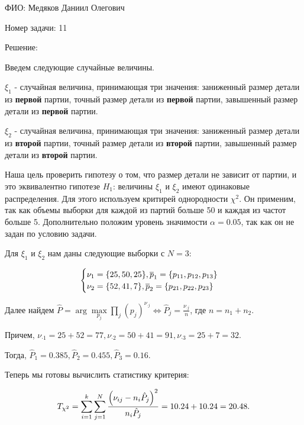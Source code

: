 \documentclass[14pt]{extarticle}
\begin{document}
ФИО: Медяков Даниил Олегович

\vspace{10pt}

Номер задачи: 11

\vspace{10pt}

Решение:

\vspace{10pt}

Введем следующие случайные величины.

$\xi_1$ - случайная величина, принимающая три значения: заниженный размер детали из \textbf{первой} партии, точный размер детали из \textbf{первой} партии, завышенный размер детали из \textbf{первой} партии.

$\xi_2$ - случайная величина, принимающая три значения: заниженный размер детали из \textbf{второй} партии, точный размер детали из \textbf{второй} партии, завышенный размер детали из \textbf{второй} партии.

Наша цель проверить гипотезу о том, что размер детали не зависит от партии, и это эквивалентно гипотезе $H_1$: величины $\xi_1$ и $\xi_2$ имеют одинаковые распределения. Для этого используем критирей однородности $\chi^2$. Он применим, так как объемы выборки для каждой из партий больше 50 и каждая из частот больше 5. Дополнительно положим уровень значимости $\alpha = 0.05$, так как он не задан по условию задачи.

Для $\xi_1$ и $\xi_2$ нам даны следующие выборки с $N = 3$:

\begin{eqnarray}
\notag
\begin{cases}
    \nu_1 = \{25, 50, 25\}, \overline{p}_1 = \{p_{11}, p_{12}, p_{13}\}\\
    \nu_2 = \{52, 41, 7\}, \overline{p}_2 = \{p_{21}, p_{22}, p_{23}\}
\end{cases}
\end{eqnarray}

Далее найдем $\hat{P} = \arg\underset{p_j}{\max}\prod\limits_j (p_j)^{\nu_{\cdot j}} \Leftrightarrow \hat{P}_j = \frac{\nu_{\cdot j}}{n}$, где $n = n_1 + n_2$.

Причем, $\nu_{\cdot 1} = 25 + 52 = 77, \nu_{\cdot 2} = 50 + 41 = 91, \nu_{\cdot 3} = 25 + 7 = 32$.

Тогда, $\hat{P}_1 = 0.385, \hat{P}_2 = 0.455, \hat{P}_3 = 0.16$.

Теперь мы готовы вычислить статистику критерия:

\begin{equation}
\notag
    T_{\chi^2} = \sum\limits_{i=1}^k\sum\limits_{j=1}^N\frac{\left(\nu_{ij} - n_i \hat{P}_j\right)^2}{n_i \hat{P}_j} = 10.24 + 10.24 = 20.48.
\end{equation}
\end{document}
